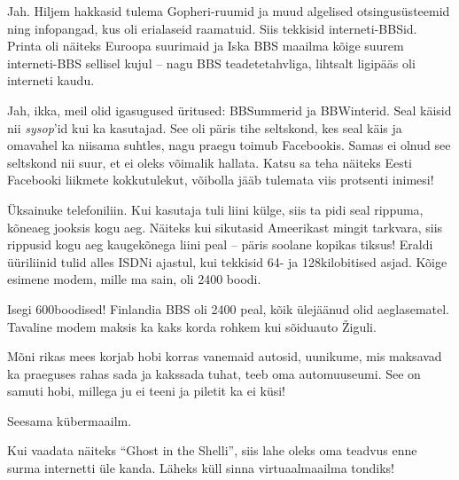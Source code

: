 Jah. Hiljem hakkasid tulema Gopheri-ruumid ja muud algelised 
otsingusüsteemid ning infopangad, kus oli erialaseid raamatuid. Siis tekkisid 
interneti-BBSid. Printa oli näiteks Euroopa suurimaid ja 
Iska BBS 
maailma kõige suurem interneti-BBS sellisel kujul -- nagu BBS 
teadetetahvliga, lihtsalt ligipääs oli interneti kaudu.


Jah, ikka, meil olid igasugused üritused: BBSummerid ja 
BBWinterid. Seal käisid nii \emph{sysop}'id kui ka kasutajad. See oli 
päris tihe seltskond, kes seal käis ja omavahel ka niisama suhtles, 
nagu praegu toimub Facebookis. Samas ei olnud see seltskond nii suur, et 
ei oleks võimalik hallata. Katsu sa teha näiteks Eesti Facebooki liikmete 
kokkutulekut, võibolla jääb tulemata viis protsenti inimesi!


Üksainuke telefoniliin. Kui kasutaja tuli liini külge, 
siis ta pidi seal rippuma, kõneaeg jooksis kogu aeg. Näiteks kui 
sikutasid Ameerikast mingit tarkvara, siis rippusid kogu aeg 
kaugekõnega liini peal -- päris soolane kopikas tiksus! Eraldi üüriliinid tulid 
alles ISDNi ajastul, kui tekkisid 64- ja 128kilobitised asjad. Kõige 
esimene modem, mille ma sain, oli 2400 boodi.


Isegi 600boodised! Finlandia BBS oli 2400 peal, kõik ülejäänud 
olid aeglasematel. Tavaline modem maksis ka kaks korda rohkem kui sõiduauto 
Žiguli.


Mõni rikas mees korjab hobi korras vanemaid autosid, 
uunikume, mis maksavad ka praeguses rahas sada ja kakssada tuhat, 
teeb oma automuuseumi. See on samuti hobi, millega ju ei 
teeni ja piletit ka ei küsi!


Seesama kübermaailm. 

Kui vaadata näiteks \enquote{Ghost in the Shelli}, siis lahe oleks 
oma teadvus enne surma internetti üle kanda. Läheks küll sinna 
virtuaalmaailma tondiks!

